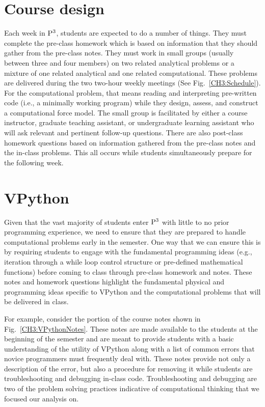 \documentclass{msuphddissertation}
\begin{document}
\begin{doublespace}
\section{Course design}

Each week in ${\rm P}^{3}$, students are expected to do a number of things. They must complete the pre-class homework which is based on information that they should gather from the pre-class notes.  They must work in small groups (usually between three and four members) on two related analytical problems or a mixture of one related analytical and one related computational.  These problems are delivered during the two two-hour weekly meetings (See Fig.~\ref{CH3:Schedule}).  For the computational problem, that means reading and interpreting pre-written code (i.e., a minimally working program) while they design, assess, and construct a computational force model.  The small group is facilitated by either a course instructor, graduate teaching assistant, or undergraduate learning assistant who will ask relevant and pertinent follow-up questions.  There are also post-class homework questions based on information gathered from the pre-class notes and the in-class problems.  This all occurs while students simultaneously prepare for the following week.

\section{VPython}

Given that the vast majority of students enter ${\rm P}^{3}$ with little to no prior programming experience, we need to ensure that they are prepared to handle computational problems early in the semester.  One way that we can ensure this is by requiring students to engage with the fundamental programming ideas (e.g., iteration through a while loop control structure or pre-defined mathematical functions) before coming to class through pre-class homework and notes.  These notes and homework questions highlight the fundamental physical and programming ideas specific to VPython and the computational problems that will be delivered in class.

For example, consider the portion of the course notes shown in Fig.~\ref{CH3:VPythonNotes}.  These notes are made available to the students at the beginning of the semester and are meant to provide students with a basic understanding of the utility of VPython along with a list of common errors that novice programmers must frequently deal with.  These notes provide not only a description of the error, but also a procedure for removing it while students are troubleshooting and debugging in-class code.  Troubleshooting and debugging are two of the problem solving practices indicative of computational thinking that we focused our analysis on.


\end{doublespace}
\end{document}
